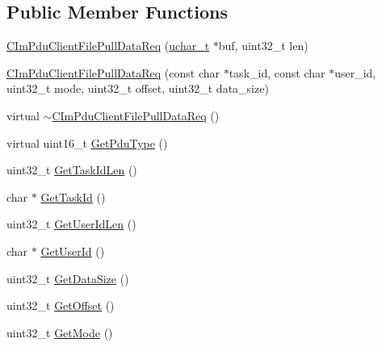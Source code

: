 \subsection*{Public Member Functions}
\begin{DoxyCompactItemize}
\item 
\hyperlink{class_c_im_pdu_client_file_pull_data_req_a4e4cc49c1191f9ef6d9313a409ca08fb}{C\+Im\+Pdu\+Client\+File\+Pull\+Data\+Req} (\hyperlink{base_2ostype_8h_a124ea0f8f4a23a0a286b5582137f0b8d}{uchar\+\_\+t} $\ast$buf, uint32\+\_\+t len)
\item 
\hyperlink{class_c_im_pdu_client_file_pull_data_req_a8c58b25338c2eb0e6a19d0d2d45d8dbf}{C\+Im\+Pdu\+Client\+File\+Pull\+Data\+Req} (const char $\ast$task\+\_\+id, const char $\ast$user\+\_\+id, uint32\+\_\+t mode, uint32\+\_\+t offset, uint32\+\_\+t data\+\_\+size)
\item 
virtual \hyperlink{class_c_im_pdu_client_file_pull_data_req_ae027890a5082bba931fddfc780ab2f88}{$\sim$\+C\+Im\+Pdu\+Client\+File\+Pull\+Data\+Req} ()
\item 
virtual uint16\+\_\+t \hyperlink{class_c_im_pdu_client_file_pull_data_req_a892684a1ce94a96487d903885e230d8a}{Get\+Pdu\+Type} ()
\item 
uint32\+\_\+t \hyperlink{class_c_im_pdu_client_file_pull_data_req_af563f39d2e108d715fdf2e5cd45778c8}{Get\+Task\+Id\+Len} ()
\item 
char $\ast$ \hyperlink{class_c_im_pdu_client_file_pull_data_req_a66c514a02da5c9a6c8220334dc306278}{Get\+Task\+Id} ()
\item 
uint32\+\_\+t \hyperlink{class_c_im_pdu_client_file_pull_data_req_a2d9b2e946f2f6bb2f02146daaa85e7e2}{Get\+User\+Id\+Len} ()
\item 
char $\ast$ \hyperlink{class_c_im_pdu_client_file_pull_data_req_a9ec886c3097c9d5c8609a0729b4674b0}{Get\+User\+Id} ()
\item 
uint32\+\_\+t \hyperlink{class_c_im_pdu_client_file_pull_data_req_a9efa002875a56c189cef879abd364526}{Get\+Data\+Size} ()
\item 
uint32\+\_\+t \hyperlink{class_c_im_pdu_client_file_pull_data_req_adad87e1b6d23923083589617788d0d9c}{Get\+Offset} ()
\item 
uint32\+\_\+t \hyperlink{class_c_im_pdu_client_file_pull_data_req_a96f70940347eb969820916f815576360}{Get\+Mode} ()
\end{DoxyCompactItemize}
